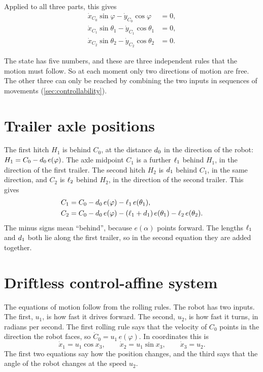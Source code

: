 Applied to all three parts, this gives
\begin{align}
  \dot x_{C_0}\sin\varphi-\dot y_{C_0}\cos\varphi&=0,\label{eq:rolling0}\\
  \dot x_{C_1}\sin\theta_1-\dot y_{C_1}\cos\theta_1&=0,\label{eq:rolling1}\\
  \dot x_{C_2}\sin\theta_2-\dot y_{C_2}\cos\theta_2&=0.\label{eq:rolling2}
\end{align}

The state has five numbers, and these are three independent rules that the
motion must follow. So at each moment only two directions of motion are free.
The other three can only be reached by combining the two inputs in sequences of
movements (\cref{sec:controllability}).

\section{Trailer axle positions}
\label{sec:positions}

The first hitch $H_1$ is behind $C_0$, at the distance $d_0$ in the direction
of the robot: $H_1=C_0-d_0\,e(\varphi)$. The axle midpoint $C_1$ is a further
$\ell_1$ behind $H_1$, in the direction of the first trailer. The second hitch
$H_2$ is $d_1$ behind $C_1$, in the same direction, and $C_2$ is $\ell_2$ behind
$H_2$, in the direction of the second trailer. This gives
\begin{align}
  C_1&=C_0-d_0\,e(\varphi)-\ell_1\,e(\theta_1),\label{eq:C1}\\
  C_2&=C_0-d_0\,e(\varphi)-(\ell_1+d_1)\,e(\theta_1)-\ell_2\,e(\theta_2).
  \label{eq:C2}
\end{align}
The minus signs mean ``behind'', because $e(\alpha)$ points forward. The lengths
$\ell_1$ and $d_1$ both lie along the first trailer, so in the second equation
they are added together.

\section{Driftless control-affine system}
\label{sec:affine}

The equations of motion follow from the rolling rules. The robot has two
inputs. The first, $u_1$, is how fast it drives forward. The second, $u_2$, is
how fast it turns, in radians per second. The first rolling rule says that the
velocity of $C_0$ points in the direction the robot faces, so
$\dot C_0=u_1\,e(\varphi)$. In coordinates this is
\begin{equation}
  \dot x_1=u_1\cos x_3,\qquad \dot x_2=u_1\sin x_3,\qquad \dot x_3=u_2 .
  \label{eq:robot}
\end{equation}
The first two equations say how the position changes, and the third says that
the angle of the robot changes at the speed $u_2$.

